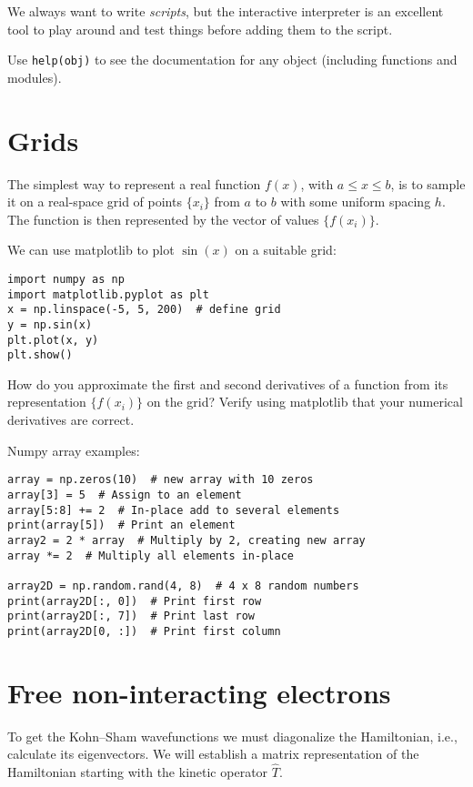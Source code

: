 \documentclass{article}
\newcommand{\exercise}[1]{
  \bigskip
  \begin{boxedminipage}[c]{0.8\linewidth}
  #1
  \end{boxedminipage}
  \bigskip
}
\begin{document}
We always want to write \emph{scripts},
but the interactive interpreter is an excellent tool to play around and test
things before adding them to the script.

Use \lstinline{help(obj)} to see the documentation for any object
(including functions and modules).

\section{Grids}
The simplest way to represent a real function $f(x)$,
with $a \le x \le b$, is to
sample it on a real-space grid of points $\{x_i\}$ from $a$ to $b$ with some
uniform spacing $h$.
The function is then represented by the vector of values $\{f(x_i)\}$.

\noindent We can use matplotlib to plot $\sin(x)$ on a suitable grid:

\begin{lstlisting}
import numpy as np
import matplotlib.pyplot as plt
x = np.linspace(-5, 5, 200)  # define grid
y = np.sin(x)
plt.plot(x, y)
plt.show()
\end{lstlisting}

\exercise{
How do you approximate the first and second derivatives of a function from
its representation $\{f(x_i)\}$ on the grid?  Verify using matplotlib that your
numerical derivatives are correct.
}

\noindent Numpy array examples:
\begin{lstlisting}
array = np.zeros(10)  # new array with 10 zeros
array[3] = 5  # Assign to an element
array[5:8] += 2  # In-place add to several elements
print(array[5])  # Print an element
array2 = 2 * array  # Multiply by 2, creating new array
array *= 2  # Multiply all elements in-place

array2D = np.random.rand(4, 8)  # 4 x 8 random numbers
print(array2D[:, 0])  # Print first row
print(array2D[:, 7])  # Print last row
print(array2D[0, :])  # Print first column
\end{lstlisting}

\section{Free non-interacting electrons}

To get the Kohn--Sham wavefunctions we must diagonalize the
Hamiltonian, i.e., calculate its eigenvectors.  We will establish a matrix
representation of the Hamiltonian starting with the kinetic operator
$\hat T$.
\end{document}
